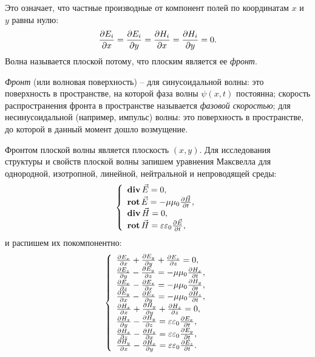 	Это означает, что частные производные от компонент полей по координатам
    \( x \) и \( y \) равны нулю:
	\[
        \frac{\partial E_i}{\partial x} = \frac{\partial E_i}{\partial y} = \frac{\partial H_i}{\partial x} =
        \frac{\partial H_i}{\partial y} = 0.
    \]
	Волна называется плоской потому, что плоским является ее \textit{фронт}.
    \begin{definition}
        \textit{Фронт} (или волновая поверхность) -- для синусоидальной волны:
        это поверхность в пространстве, на которой фаза волны \( \psi(x, t) \)
        постоянна; скорость распространения фронта в пространстве называется
        \textit{фазовой скоростью}; для несинусоидальной (например, импульс)
        волны: это поверхность в пространстве, до которой в данный момент дошло
        возмущение.
    \end{definition}
	Фронтом плоской волны является плоскость \( (x, y) \). Для исследования
    структуры и свойств плоской волны запишем уравнения Максвелла для
    однородной, изотропной, линейной, нейтральной и непроводящей среды:
	\[
        \left\{
        \begin{array}{l}
            \mathbf{div\,}\vec{E} = 0, \\
            \mathbf{rot\,}\vec{E} = -\mu\mu_0\frac{\partial \vec{H}}{\partial t}, \\
            \mathbf{div\,}\vec{H} = 0, \\
            \mathbf{rot\,}\vec{H} = \varepsilon\varepsilon_0\frac{\partial \vec{E}}{\partial t},
        \end{array}
        \right.
    \]
	и распишем их покомпонентно:
	\[
        \left\{
        \begin{array}{l}
            \frac{\partial E_x}{\partial x} + \frac{\partial E_y}{\partial y} + \frac{\partial E_z}{\partial z} = 0, \\
            \frac{\partial E_z}{\partial y} - \frac{\partial E_y}{\partial z} = -\mu\mu_0\frac{\partial H_x}{\partial t}, \\
            \frac{\partial E_x}{\partial z} - \frac{\partial E_z}{\partial x} = -\mu\mu_0\frac{\partial H_y}{\partial t}, \\
            \frac{\partial E_y}{\partial x} - \frac{\partial E_x}{\partial y} = -\mu\mu_0\frac{\partial H_z}{\partial t}, \\
            \frac{\partial H_x}{\partial x} + \frac{\partial H_y}{\partial y} + \frac{\partial H_z}{\partial z} = 0, \\
            \frac{\partial H_z}{\partial y} - \frac{\partial H_y}{\partial z} =
                \varepsilon\varepsilon_0\frac{\partial E_x}{\partial t}, \\
            \frac{\partial H_x}{\partial z} - \frac{\partial H_z}{\partial x} =
                \varepsilon\varepsilon_0\frac{\partial E_y}{\partial t}, \\
            \frac{\partial H_y}{\partial x} - \frac{\partial H_x}{\partial y} =
                \varepsilon\varepsilon_0\frac{\partial E_z}{\partial t}.
	    \end{array}
        \right.
    \]
